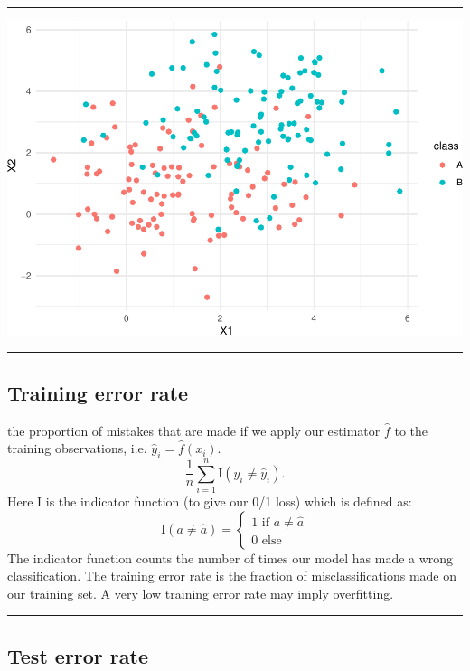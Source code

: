 \documentclass[]{article}
\begin{document}
\begin{center}\rule{0.5\linewidth}{\linethickness}\end{center}

\includegraphics{2StatLearn_files/figure-latex/knn-1.pdf}

\begin{center}\rule{0.5\linewidth}{\linethickness}\end{center}

\hypertarget{training-error-rate}{%
\subsection{Training error rate}\label{training-error-rate}}

the proportion of mistakes that are made if we apply our estimator
\(\hat{f}\) to the training observations, i.e.
\(\hat{y}_i=\hat{f}(x_i)\).
\[\frac{1}{n}\sum_{i=1}^n \text{I}(y_i \neq \hat{y}_i).\] Here I is the
indicator function (to give our 0/1 loss) which is defined as:
\[\text{I}(a\neq\hat{a}) = \begin{cases} 1 \text{ if } a \neq \hat{a} \\ 0 \text{ else } \end{cases}\]
The indicator function counts the number of times our model has made a
wrong classification. The training error rate is the fraction of
misclassifications made on our training set. A very low training error
rate may imply overfitting.

\begin{center}\rule{0.5\linewidth}{\linethickness}\end{center}

\hypertarget{test-error-rate}{%
\subsection{Test error rate}\label{test-error-rate}}
\end{document}
